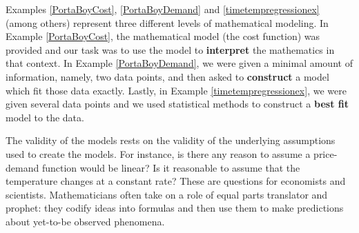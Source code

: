\documentclass{ximera}
\begin{document}
Examples \ref{PortaBoyCost}, \ref{PortaBoyDemand} and \ref{timetempregressionex} (among others)  represent three different levels of mathematical modeling.  In Example  \ref{PortaBoyCost},  the mathematical model (the cost function) was provided and our task was to use the model to \textbf{interpret} the mathematics in that context.    In Example  \ref{PortaBoyDemand}, we were given a minimal amount of information, namely, two data points, and then asked to \textbf{construct} a model which fit those data exactly.  Lastly, in Example \ref{timetempregressionex}, we were given several data points and we used statistical methods to construct a \textbf{best fit} model to the data. 



The validity of the models rests on the validity of the underlying assumptions used to create the models.  For instance, is there any reason to assume a price-demand function would be linear?  Is it reasonable to assume that the temperature changes at a constant rate? These are questions for economists and scientists.  Mathematicians often take on a role of equal parts translator and prophet:  they codify ideas into formulas and then use them to make predictions about yet-to-be observed phenomena.  
\end{document}
